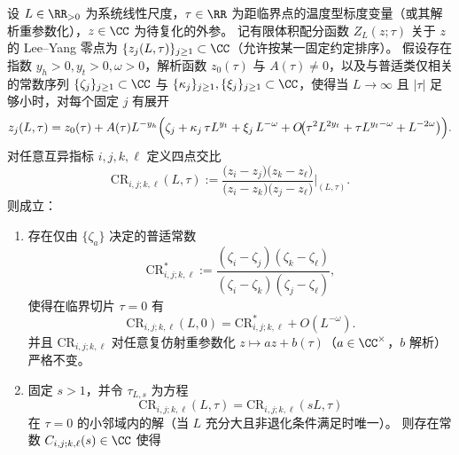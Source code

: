 \begin{theorem}\label{thm:xi-leyang-crossratio-demixing-crossing}
设 \(L\in\RR_{>0}\) 为系统线性尺度，\(\tau\in\RR\) 为距临界点的温度型标度变量（或其解析重参数化），\(z\in\CC\) 为待复化的外参。
记有限体积配分函数 \(Z_L(z;\tau)\) 关于 \(z\) 的 Lee--Yang 零点为 \(\{z_j(L,\tau)\}_{j\ge 1}\subset\CC\)（允许按某一固定约定排序）。
假设存在指数 \(y_h>0,y_t>0,\omega>0\)，解析函数 \(z_0(\tau)\) 与 \(A(\tau)\neq 0\)，以及与普适类仅相关的常数序列 \(\{\zeta_j\}_{j\ge 1}\subset\CC\) 与 \(\{\kappa_j\}_{j\ge 1},\{\xi_j\}_{j\ge 1}\subset\CC\)，使得当 \(L\to\infty\) 且 \(|\tau|\) 足够小时，对每个固定 \(j\) 有展开
\begin{equation}\label{eq:xi-leyang-fss-analytic-mixing}
z_j(L,\tau)
=
z_0(\tau)
+
A(\tau)L^{-y_h}\Bigl(
\zeta_j
+
\kappa_j\,\tau L^{y_t}
+
\xi_j\,L^{-\omega}
+
O\!\bigl(\tau^2L^{2y_t}+\tau L^{y_t-\omega}+L^{-2\omega}\bigr)
\Bigr).
\end{equation}
对任意互异指标 \(i,j,k,\ell\) 定义四点交比
\begin{equation}\label{eq:xi-leyang-crossratio-def}
\mathrm{CR}_{i,j;k,\ell}(L,\tau)
:=
\frac{\bigl(z_i-z_j\bigr)\bigl(z_k-z_\ell\bigr)}{\bigl(z_i-z_k\bigr)\bigl(z_j-z_\ell\bigr)}\Bigg|_{(L,\tau)}.
\end{equation}
则成立：
\begin{enumerate}
  \item 存在仅由 \(\{\zeta_a\}\) 决定的普适常数
  \begin{equation}\label{eq:xi-leyang-crossratio-universal}
  \mathrm{CR}_{i,j;k,\ell}^{\ast}
  :=
  \frac{(\zeta_i-\zeta_j)(\zeta_k-\zeta_\ell)}{(\zeta_i-\zeta_k)(\zeta_j-\zeta_\ell)},
  \end{equation}
  使得在临界切片 \(\tau=0\) 有
  \begin{equation}\label{eq:xi-leyang-crossratio-critical-limit}
  \mathrm{CR}_{i,j;k,\ell}(L,0)=\mathrm{CR}_{i,j;k,\ell}^{\ast}+O(L^{-\omega}).
  \end{equation}
  并且 \(\mathrm{CR}_{i,j;k,\ell}\) 对任意复仿射重参数化 \(z\mapsto az+b(\tau)\)（\(a\in\CC^{\times}\)，\(b\) 解析）严格不变。
  \item 固定 \(s>1\)，并令 \(\tau_{L,s}\) 为方程
  \begin{equation}\label{eq:xi-leyang-crossratio-crossing-eq}
  \mathrm{CR}_{i,j;k,\ell}(L,\tau)=\mathrm{CR}_{i,j;k,\ell}(sL,\tau)
  \end{equation}
  在 \(\tau=0\) 的小邻域内的解（当 \(L\) 充分大且非退化条件满足时唯一）。
  则存在常数 \(C_{i,j;k,\ell}(s)\in\CC\) 使得

\end{enumerate}
\end{theorem}
